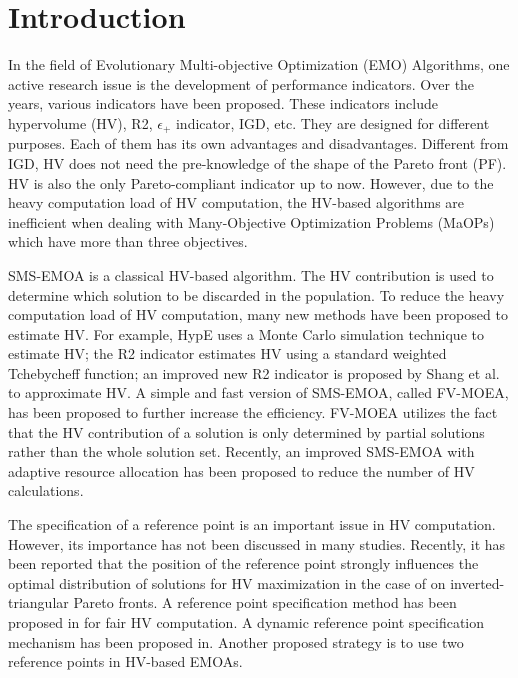 \documentclass[conference]{IEEEtran}
\begin{document}
\section{Introduction}
In the field of Evolutionary Multi-objective Optimization (EMO) Algorithms, 
one active research issue is the development of performance indicators. 
Over the years, various indicators have been proposed. 
These indicators include hypervolume (HV)\cite{hypervolume}, 
R2\cite{R2}, $\epsilon_+$ indicator\cite{e+}, IGD\cite{IGD}, etc.
They are designed for different purposes. 
Each of them has its own advantages and disadvantages.
Different from IGD, 
HV does not need the pre-knowledge of the shape of the Pareto front (PF). 
HV is also the only Pareto-compliant indicator up to now\cite{pareto_compliant}. 
However, due to the heavy computation load of HV computation\cite{hypervolume:computationLoad}, 
the HV-based algorithms are inefficient when dealing with Many-Objective Optimization Problems (MaOPs) which have more than three objectives. 

SMS-EMOA\cite{smsemoa} is a classical HV-based algorithm. 
The HV contribution is used to determine which solution to be discarded in the population. 
To reduce the heavy computation load of HV computation, 
many new methods have been proposed to estimate HV. 
For example, HypE uses a Monte Carlo simulation technique to estimate HV\cite{HypE}; 
the R2 indicator estimates HV using a standard weighted Tchebycheff function\cite{R2}; 
an improved new R2 indicator is proposed by Shang et al.\cite{newR2} to approximate HV.  
A simple and fast version of SMS-EMOA, called FV-MOEA\cite{FVEMOA}, has been proposed to further increase the efficiency.
FV-MOEA utilizes the fact that 
the HV contribution of a solution is only determined by partial solutions rather than the whole solution set\cite{FVEMOA}. 
Recently, an improved SMS-EMOA with adaptive resource allocation has been proposed to reduce the number of HV calculations\cite{ismsemoa}. 

The specification of a reference point is an important issue in HV computation. 
However, its importance has not been discussed in many studies. 
Recently, it has been reported that the position of the reference point strongly influences the optimal distribution of solutions 
for HV maximization in the case of on inverted-triangular Pareto fronts\cite{hisao:RPhowtoSpecify, hisao:RPspecify, hisao:RPexplanation}. 
A reference point specification method has been proposed in \cite{hisao:RPhowtoSpecify} for fair HV computation.
A dynamic reference point specification mechanism has been proposed in\cite{hisao:dynamic}.
Another proposed strategy is to use two reference points in HV-based EMOAs\cite{hisao:twoRP}. 
\end{document}
